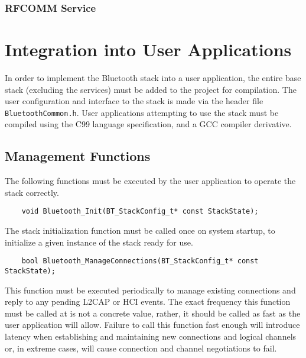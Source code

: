 \FloatBarrier
\subsubsection{RFCOMM Service}


\section{Integration into User Applications}

In order to implement the Bluetooth stack into a user application, the entire base stack (excluding the services) must be added to the project for compilation. The user configuration and interface to the stack is made via the header file \texttt{BluetoothCommon.h}. User applications attempting to use the stack must be compiled using the C99 language specification, and a GCC compiler derivative.

\FloatBarrier
\subsection{Management Functions}

The following functions must be executed by the user application to operate the stack correctly.

\vspace{1em}
\begin{lstlisting}
	void Bluetooth_Init(BT_StackConfig_t* const StackState);
\end{lstlisting}

The stack initialization function must be called once on system startup, to initialize a given instance of the stack ready for use.

\vspace{1em}
\begin{lstlisting}
	bool Bluetooth_ManageConnections(BT_StackConfig_t* const StackState);
\end{lstlisting}

This function must be executed periodically to manage existing connections and reply to any pending L2CAP or HCI events. The exact frequency this function must be called at is not a concrete value, rather, it should be called as fast as the user application will allow. Failure to call this function fast enough will introduce latency when establishing and maintaining new connections and logical channels or, in extreme cases, will cause connection and channel negotiations to fail.
	
